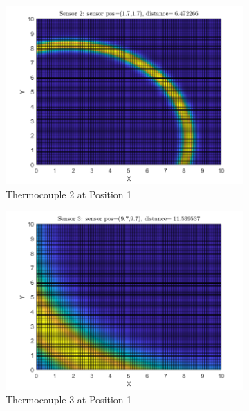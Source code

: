 \documentclass[12pt]{article}
\begin{document}
\begin{figure}[H]
\begin{subfigure}[h]{0.4\textwidth}
        \includegraphics[width=\textwidth]{images/P1S2.png}
        \caption{Thermocouple 2 at Position 1}
        \label{fig:P1S2}
    \end{subfigure}
    \baselineskip
    \begin{subfigure}[h]{0.4\textwidth}
        \includegraphics[width=\textwidth]{images/P1S3.png}
        \caption{Thermocouple 3 at Position 1}
        \label{fig:P1S3}
    \end{subfigure}
    \begin{subfigure}[h]{0.4\textwidth}

\end{subfigure}
\end{figure}
\end{document}
